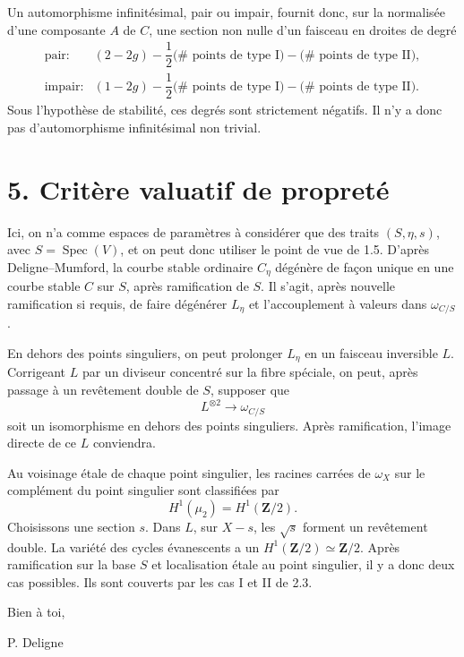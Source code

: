 \documentclass[11pt]{article}
\newcommand{\Spec}{\operatorname{Spec}}
\begin{document}
Un automorphisme infinitésimal, pair ou impair, fournit donc, sur la normalisée d'une composante \(A\) de \(C\), une section non nulle d'un faisceau en droites de degré
\[
\begin{array}{ll}
\text{pair}:&
(2-2g)-\dfrac12\bigl(\#\text{ points de type I}\bigr)-\bigl(\#\text{ points de type II}\bigr),\\[3mm]
\text{impair}:&
(1-2g)-\dfrac12\bigl(\#\text{ points de type I}\bigr)-\bigl(\#\text{ points de type II}\bigr).
\end{array}
\]
Sous l'hypothèse de stabilité, ces degrés sont strictement négatifs. Il n'y a donc pas d'automorphisme infinitésimal non trivial.

\section*{5. Critère valuatif de propreté}

Ici, on n'a comme espaces de paramètres à considérer que des traits \((S,\eta,s)\), avec \(S=\Spec(V)\), et on peut donc utiliser le point de vue de 1.5. D'après Deligne--Mumford, la courbe stable ordinaire \(C_\eta\) dégénère de façon unique en une courbe stable \(C\) sur \(S\), après ramification de \(S\). Il s'agit, après nouvelle ramification si requis, de faire dégénérer \(L_\eta\) et l'accouplement à valeurs dans \(\omega_{C/S}\).

En dehors des points singuliers, on peut prolonger \(L_\eta\) en un faisceau inversible \(L\). Corrigeant \(L\) par un diviseur concentré sur la fibre spéciale, on peut, après passage à un revêtement double de \(S\), supposer que
\[
  L^{\otimes2}\longrightarrow \omega_{C/S}
\]
soit un isomorphisme en dehors des points singuliers. Après ramification, l'image directe de ce \(L\) conviendra.

Au voisinage étale de chaque point singulier, les racines carrées de \(\omega_X\) sur le complément du point singulier sont classifiées par
\[
  H^1(\mu_2)=H^1(\mathbf Z/2).
\]
Choisissons une section \(s\). Dans \(L\), sur \(X-s\), les \(\sqrt{s}\) forment un revêtement double. La variété des cycles évanescents a un \(H^1(\mathbf Z/2)\simeq\mathbf Z/2\). Après ramification sur la base \(S\) et localisation étale au point singulier, il y a donc deux cas possibles. Ils sont couverts par les cas I et II de 2.3.

Bien à toi,

\hfill P. Deligne
\end{document}
